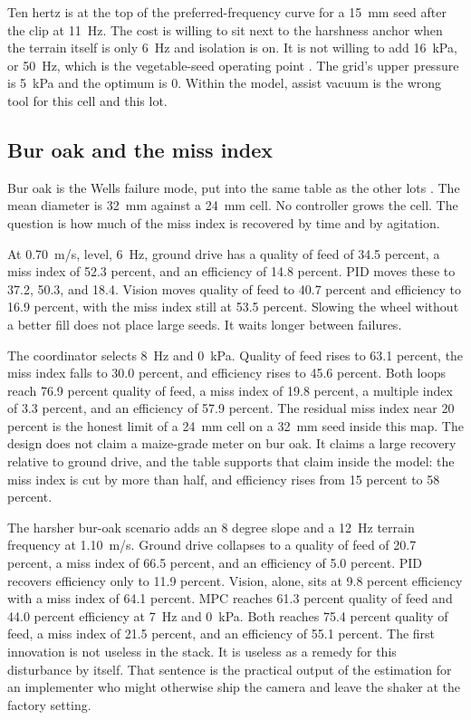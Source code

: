 Ten hertz is at the top of the preferred-frequency curve for a 15~mm seed after the clip at 11~Hz. The cost is willing to sit next to the harshness anchor when the terrain itself is only 6~Hz and isolation is on. It is not willing to add 16~kPa, or 50~Hz, which is the vegetable-seed operating point \cite{li2025drum}. The grid's upper pressure is 5~kPa and the optimum is 0. Within the model, assist vacuum is the wrong tool for this cell and this lot.

\subsection{Bur oak and the miss index}

Bur oak is the Wells failure mode, put into the same table as the other lots \cite{wells1990}. The mean diameter is 32~mm against a 24~mm cell. No controller grows the cell. The question is how much of the miss index is recovered by time and by agitation.

At 0.70~m/s, level, 6~Hz, ground drive has a quality of feed of 34.5 percent, a miss index of 52.3 percent, and an efficiency of 14.8 percent. PID moves these to 37.2, 50.3, and 18.4. Vision moves quality of feed to 40.7 percent and efficiency to 16.9 percent, with the miss index still at 53.5 percent. Slowing the wheel without a better fill does not place large seeds. It waits longer between failures.

The coordinator selects 8~Hz and 0~kPa. Quality of feed rises to 63.1 percent, the miss index falls to 30.0 percent, and efficiency rises to 45.6 percent. Both loops reach 76.9 percent quality of feed, a miss index of 19.8 percent, a multiple index of 3.3 percent, and an efficiency of 57.9 percent. The residual miss index near 20 percent is the honest limit of a 24~mm cell on a 32~mm seed inside this map. The design does not claim a maize-grade meter on bur oak. It claims a large recovery relative to ground drive, and the table supports that claim inside the model: the miss index is cut by more than half, and efficiency rises from 15 percent to 58 percent.

The harsher bur-oak scenario adds an 8 degree slope and a 12~Hz terrain frequency at 1.10~m/s. Ground drive collapses to a quality of feed of 20.7 percent, a miss index of 66.5 percent, and an efficiency of 5.0 percent. PID recovers efficiency only to 11.9 percent. Vision, alone, sits at 9.8 percent efficiency with a miss index of 64.1 percent. MPC reaches 61.3 percent quality of feed and 44.0 percent efficiency at 7~Hz and 0~kPa. Both reaches 75.4 percent quality of feed, a miss index of 21.5 percent, and an efficiency of 55.1 percent. The first innovation is not useless in the stack. It is useless as a remedy for this disturbance by itself. That sentence is the practical output of the estimation for an implementer who might otherwise ship the camera and leave the shaker at the factory setting.

